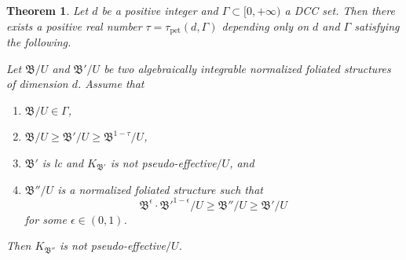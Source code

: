 \documentclass[11pt,reqno]{amsart}
\numberwithin{equation}{section}
\newcommand{\pet}{\operatorname{pet}}
\newcommand{\Bb}{{\mathfrak{B}}}
\newcommand{\Ii}{\Gamma}
\newtheorem{thm}{Theorem}[section]
\theoremstyle{definition}
\begin{document}
\begin{thm}\label{thm: pet general}
    Let $d$ be a positive integer and $\Ii\subset [0,+\infty)$ a DCC set. Then there exists a positive real number $\tau=\tau_{\pet}(d,\Ii)$ depending only on $d$ and $\Ii$ satisfying the following. 

    Let $\Bb/U$ and $\Bb'/U$ be two algebraically integrable normalized foliated structures of dimension $d$. Assume that
    \begin{enumerate}
        \item $\Bb/U\in\Ii$,
        \item $\Bb/U\geq\Bb'/U\geq\Bb^{1-\tau}/U$,
        \item $\Bb'$ is lc and $K_{\Bb'}$ is not pseudo-effective$/U$, and
        \item $\Bb''/U$ is a normalized foliated structure such that $$\Bb^{\epsilon}\cdot\Bb'^{1-\epsilon}/U\geq\Bb''/U\geq\Bb'/U$$
        for some $\epsilon\in (0,1)$.
    \end{enumerate}
    Then $K_{\Bb''}$ is not pseudo-effective$/U$.
\end{thm}
\end{document}
